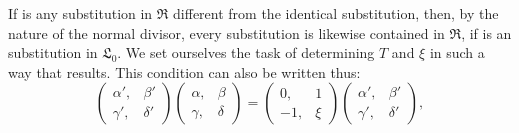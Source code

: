 If
is any substitution in $\mathfrak{R}$ different from the identical substitution,
 then, by the nature of the normal divisor, every
substitution
is likewise contained in $\mathfrak{R}$, if
is an  substitution in $\mathfrak{L}_0$.
We set ourselves the task of determining $T$ and $\xi$ in such a way that
results. This condition can also be written thus:
\[
\begin{pmatrix}\alpha', & \beta'\\ \gamma', & \delta'\end{pmatrix}\begin{pmatrix}\alpha, & \beta\\ \gamma, & \delta\end{pmatrix}=\begin{pmatrix}0, & 1\\ -1, & \xi\end{pmatrix}\begin{pmatrix}\alpha', & \beta'\\ \gamma', & \delta'\end{pmatrix},
\]
